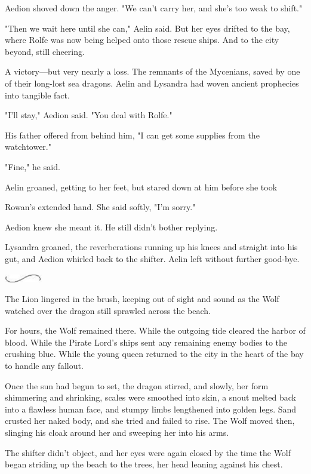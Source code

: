 Aedion shoved down the anger. "We can't carry her, and she's too weak to shift."

"Then we wait here until she can," Aelin said. But her eyes drifted to the bay, where Rolfe was now being helped onto those rescue ships. And to the city beyond, still cheering.

A victory---but very nearly a loss. The remnants of the Mycenians, saved by one of their long-lost sea dragons. Aelin and Lysandra had woven ancient prophecies into tangible fact.

"I'll stay," Aedion said. "You deal with Rolfe."

His father offered from behind him, "I can get some supplies from the watchtower."

"Fine," he said.

Aelin groaned, getting to her feet, but stared down at him before she took

Rowan's extended hand. She said softly, "I'm sorry."

Aedion knew she meant it. He still didn't bother replying.

Lysandra groaned, the reverberations running up his knees and straight into his gut, and Aedion whirled back to the shifter. Aelin left without further good-bye.

\includegraphics[width=0.65in,height=0.13in]{images/seperator}

The Lion lingered in the brush, keeping out of sight and sound as the Wolf watched over the dragon still sprawled across the beach.

For hours, the Wolf remained there. While the outgoing tide cleared the harbor of blood. While the Pirate Lord's ships sent any remaining enemy bodies to the crushing blue. While the young queen returned to the city in the heart of the bay to handle any fallout.

Once the sun had begun to set, the dragon stirred, and slowly, her form shimmering and shrinking, scales were smoothed into skin, a snout melted back into a flawless human face, and stumpy limbs lengthened into golden legs. Sand crusted her naked body, and she tried and failed to rise. The Wolf moved then, slinging his cloak around her and sweeping her into his arms.

The shifter didn't object, and her eyes were again closed by the time the Wolf began striding up the beach to the trees, her head leaning against his chest.

